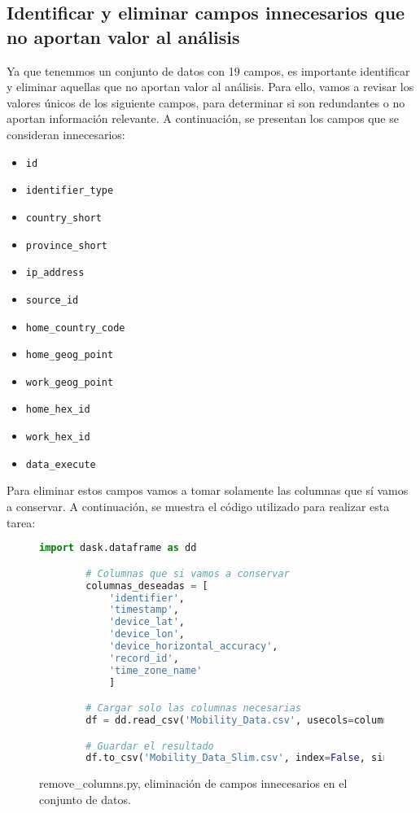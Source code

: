 \subsection{Identificar y eliminar campos innecesarios que no aportan valor al análisis}
\noindent Ya que tenemmos un conjunto de datos con 19 campos, es importante identificar y eliminar aquellas que no aportan valor al análisis. Para ello, vamos a revisar los valores únicos de los siguiente campos, para determinar si son redundantes o no aportan información relevante. A continuación, se presentan los campos que se consideran innecesarios:
\begin{itemize}
    \item \texttt{id}
    \item \texttt{identifier\_type}
    \item \texttt{country\_short}
    \item \texttt{province\_short}
    \item \texttt{ip\_address}
    \item \texttt{source\_id}
    \item \texttt{home\_country\_code}
    \item \texttt{home\_geog\_point}
    \item \texttt{work\_geog\_point}
    \item \texttt{home\_hex\_id}
    \item \texttt{work\_hex\_id}
    \item \texttt{data\_execute}
\end{itemize}

\noindent Para eliminar estos campos vamos a tomar solamente las columnas que sí vamos a conservar. A continuación, se muestra el código utilizado para realizar esta tarea:
\begin{figure}[h]
    \centering
    \begin{lstlisting}[language=Python, breaklines=true]
        import dask.dataframe as dd

        # Columnas que si vamos a conservar
        columnas_deseadas = [
            'identifier',
            'timestamp',
            'device_lat',
            'device_lon',
            'device_horizontal_accuracy',
            'record_id',
            'time_zone_name'
            ]

        # Cargar solo las columnas necesarias
        df = dd.read_csv('Mobility_Data.csv', usecols=columnas_deseadas)

        # Guardar el resultado
        df.to_csv('Mobility_Data_Slim.csv', index=False, single_file=True, encoding='utf-8-sig')
    \end{lstlisting}
    \caption{remove\_columns.py, eliminación de campos innecesarios en el conjunto de datos.}
    \label{fig:csv_slim}
\end{figure}

